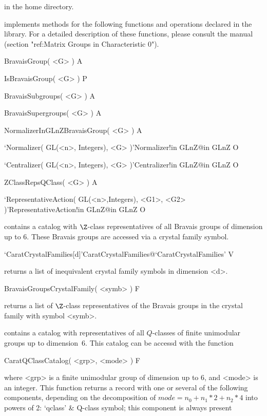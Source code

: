 in the {\CARAT} home directory.



{\CARAT} implements methods for the following functions and operations
declared in the {\GAP} library. For a detailed description of these
functions, please consult the {\GAP} manual (section 
"ref:Matrix Groups in Characteristic 0").

\>BravaisGroup( <G> ) A

\>IsBravaisGroup( <G> ) P

\>BravaisSubgroups( <G> ) A

\>BravaisSupergroups( <G> ) A

\>NormalizerInGLnZBravaisGroup( <G> ) A

\>`Normalizer( GL(<n>, Integers), <G> )'{Normalizer!in GLnZ}@{in GLnZ} O

\>`Centralizer( GL(<n>, Integers), <G> )'{Centralizer!in GLnZ}@{in GLnZ} O

\>ZClassRepsQClass( <G> ) A

\>`RepresentativeAction( GL(<n>,Integers), <G1>, <G2> )'{RepresentativeAction!in GLnZ}@{in GLnZ} O



{\CARAT} contains a catalog with $\Z$-class representatives of all
Bravais groups of dimension up to 6. These Bravais groups are
accessed via a crystal family symbol.

\>`CaratCrystalFamilies[d]'{CaratCrystalFamilies}@{`CaratCrystalFamilies'} V

returns a list of inequivalent crystal family symbols in dimension <d>.

\>BravaisGroupsCrystalFamily( <symb> ) F

returns a list of $\Z$-class representatives of the Bravais groups
in the crystal family with symbol <symb>.


{\CARAT} contains a catalog with representatives of all $Q$-classes of
finite unimodular groups up to dimension~6. This catalog can be accessd
with the function

\>CaratQClassCatalog( <grp>, <mode> ) F

where <grp> is a finite unimodular group of dimension up to 6, and
<mode> is an integer. This function returns a record with one or
several of the following components, depending on the decomposition of
$mode = n_{0} + n_{1} * 2 + n_{2} * 4$ into powers of 2:
\beginitems
`qclass'     & Q-class symbol; this component is always present

